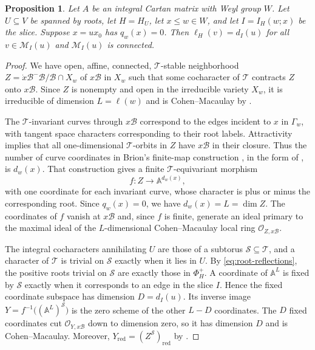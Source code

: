 \documentclass[11pt]{amsart}
\newtheorem{proposition}[proposition]{Proposition}
\theoremstyle{definition}
\theoremstyle{remark}
\numberwithin{equation}{section}
\newcommand{\A}{\mathbb A}
\begin{document}
\begin{proposition}\label{prop:slice-geometry}
Let $A$ be an integral Cartan matrix with Weyl group $W$. Let $U\subseteq V$ be spanned by roots, let
$H=H_U$, let $x\le w \in W$, and let $I=I_H(w;x)$ be the slice. Suppose $x=ux_0$ has
$q_w(x)=0$. Then $\ell_H(v)=d_I(u)$ for all $v\in\mathcal M_I(u)$ and $\mathcal M_I(u)$ is connected.
\end{proposition}
\begin{proof}
We have open, affine, connected, $\mathcal T$-stable neighborhood $Z=\dot{x}\mathcal{B}^-\mathcal{B}/\mathcal{B} \cap X_w$ 
of $x\mathcal{B}$ in $X_w$ such that some cocharacter
of $\mathcal T$ contracts $Z$ onto $x\mathcal{B}$.
Since $Z$ is nonempty and open in the irreducible
variety $X_w$, it is irreducible of dimension $L=\ell(w)$ and is
Cohen--Macaulay by \cite[Thm.~3(a)]{Mathieu}.

The $\mathcal T$-invariant curves through $x\mathcal{B}$ correspond to the edges incident to $x$ in $\Gamma_w$, with tangent space characters corresponding to their root labels. Attractivity implies that all
one-dimensional $\mathcal T$-orbits in $Z$ have $x\mathcal{B}$ in their
closure. Thus the number of curve coordinates in Brion's
finite-map construction \cite[Thm.~17]{BrionEquivariant},
in the form of \cite[Lem.~3.4]{FW}, is
$d_w(x)$. That construction gives a finite $\mathcal T$-equivariant morphism
\[
 f:Z\longrightarrow\A^{d_w(x)},
\]
with one coordinate for each invariant curve, whose character
is plus or minus the corresponding root. Since $q_w(x)=0$, we have $d_w(x)=L=\dim Z$. The coordinates of $f$ vanish at $x\mathcal{B}$ and, since $f$ is
finite, generate an ideal primary to the maximal ideal of the
$L$-dimensional Cohen--Macaulay local ring
$\mathcal O_{Z,x\mathcal{B}}$. 

The integral cocharacters annihilating $U$ are those of a subtorus
$\mathcal S\subseteq\mathcal T$, and a character of $\mathcal T$
is trivial on $\mathcal S$ exactly when it lies in $U$. By
\eqref{eq:root-reflections}, the positive roots trivial on
$\mathcal S$ are exactly those in $\Phi_H^+$. A coordinate of $\A^L$ is fixed by $\mathcal S$ exactly when it corresponds to an edge in the slice $I$. Hence the fixed coordinate subspace has dimension
$D=d_I(u)$. Its inverse image $Y=f^{-1}\bigl((\A^L)^{\mathcal S}\bigr)$ is the zero scheme of the other $L-D$ coordinates. The $D$ fixed
coordinates cut $\mathcal O_{Y,x\mathcal{B}}$ down to dimension zero,
so it has dimension $D$ and is Cohen--Macaulay. Moreover, $Y_{\mathrm{red}}=(Z^{\mathcal S})_{\mathrm{red}}$ by \cite[proof of Lem.~3.4]{FW}.


\end{proof}
\end{document}

